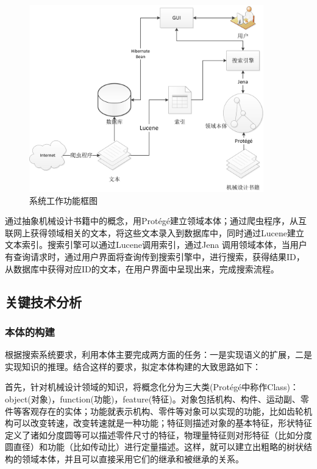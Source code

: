 \documentclass[12pt,a4paper]{article}
\newcommand{\wuhao}{\fontsize{10.5pt}{\baselineskip}\selectfont}
\begin{document}
	\begin{figure}[htbp] 
	\centering\includegraphics[width=4in]{fig/功能框图.jpg} 
	\caption{\wuhao 系统工作功能框图}\label{fig:功能框图} 
	\end{figure} 
	
	通过抽象机械设计书籍中的概念，用{\Times Prot{\'e}g{\'e}}建立领域本体；通过爬虫程序，从互联网上获得领域相关的文本，将这些文本录入到数据库中，同时通过{\Times Lucene}建立文本索引。搜索引擎可以通过{\Times Lucene}调用索引，通过{\Times Jena }调用领域本体，当用户有查询请求时，通过用户界面将查询传到搜索引擎中，进行搜索，获得结果{\Times ID}，从数据库中获得对应{\Times ID}的文本，在用户界面中呈现出来，完成搜索流程。
				
	\subsection{关键技术分析}
		\subsubsection{本体的构建}
	根据搜索系统要求，利用本体主要完成两方面的任务：一是实现语义的扩展，二是实现知识的推理。结合这样的要求，拟定本体构建的大致思路如下：
	
	首先，针对机械设计领域的知识，将概念化分为三大类({\Times Prot{\'e}g{\'e}}中称作{\Times Class})： {\Times object}(对象)，{\Times function}(功能)，{\Times feature}(特征)。对象包括机构、构件、运动副、零件等客观存在的实体；功能就表示机构、零件等对象可以实现的功能，比如齿轮机构可以改变转速，改变转速就是一种功能；特征则描述对象的基本特征，形状特征定义了诸如分度圆等可以描述零件尺寸的特征，物理量特征则对形特征（比如分度圆直径）和功能（比如传动比）进行定量描述。这样，就可以建立出粗略的树状结构的领域本体，并且可以直接采用它们的继承和被继承的关系。
	
\end{document}

